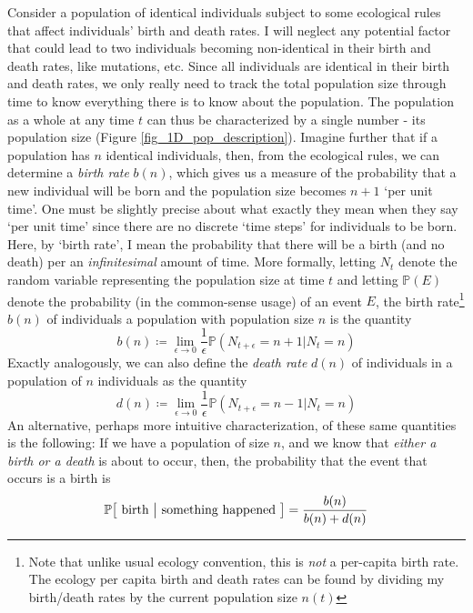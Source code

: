 Consider a population of identical individuals subject to some ecological rules that affect individuals' birth and death rates. I will neglect any potential factor that could lead to two individuals becoming non-identical in their birth and death rates, like mutations, etc. Since all individuals are identical in their birth and death rates, we only really need to track the total population size through time to know everything there is to know about the population. The population as a whole at any time $t$ can thus be characterized by a single number - its population size (Figure \ref{fig_1D_pop_description}). Imagine further that if a population has $n$ identical individuals, then, from the ecological rules, we can determine a \emph{birth rate} $b(n)$, which gives us a measure of the probability that a new individual will be born and the population size becomes $n+1$ `per unit time'. One must be slightly precise about what exactly they mean when they say `per unit time' since there are no discrete `time steps' for individuals to be born. Here, by `birth rate', I mean the probability that there will be a birth (and no death) per an \emph{infinitesimal} amount of time. More formally, letting $N_t$ denote the random variable representing the population size at time $t$ and letting $\mathbb{P}(E)$ denote the probability (in the common-sense usage) of an event $E$, the birth rate\footnote{Note that unlike usual ecology convention, this is \emph{not} a per-capita birth rate. The ecology per capita birth and death rates can be found by dividing my birth/death rates by the current population size $n(t)$} $b(n)$ of individuals a population with population size $n$ is the quantity
\begin{equation}
	\label{1D_birthrate_defn}
	b(n) \coloneqq \lim_{\epsilon \to 0}\frac{1}{\epsilon}\mathbb{P}\left(N_{t+\epsilon}=n+1 | N_{t}=n\right)
\end{equation}
Exactly analogously, we can also define the \emph{death rate} $d(n)$ of individuals in a population of $n$ individuals as the quantity
\begin{equation}
	\label{1D_deathrate_defn}
	d(n) \coloneqq \lim_{\epsilon \to 0}\frac{1}{\epsilon}\mathbb{P}\left(N_{t+\epsilon}=n-1 | N_{t}=n\right)
\end{equation}
An alternative, perhaps more intuitive characterization, of these same quantities is the following: If we have a population of size $n$, and we know that \emph{either a birth or a death} is about to occur, then, the probability that the event that occurs is a birth is
\begin{equation*}
	\mathbb{P\big[\textrm{ birth } \big{|} \textrm{ something happened }\big]} = \frac{b(n)}{b(n)+d(n)}
\end{equation*}
